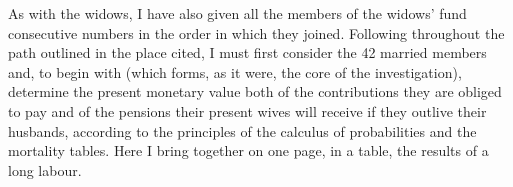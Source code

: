 \par{}\smallskip
As with the widows, I have also given all the members of the widows' fund consecutive numbers in the order in which they joined. Following throughout the path outlined in the place cited, I must first consider the 42 married members and, to begin with (which forms, as it were, the core of the investigation), determine the present monetary value both of the contributions they are obliged to pay and of the pensions their present wives will receive if they outlive their husbands, according to the principles of the calculus of probabilities and the mortality tables. Here I bring together on one page, in a table, the results of a long labour.

